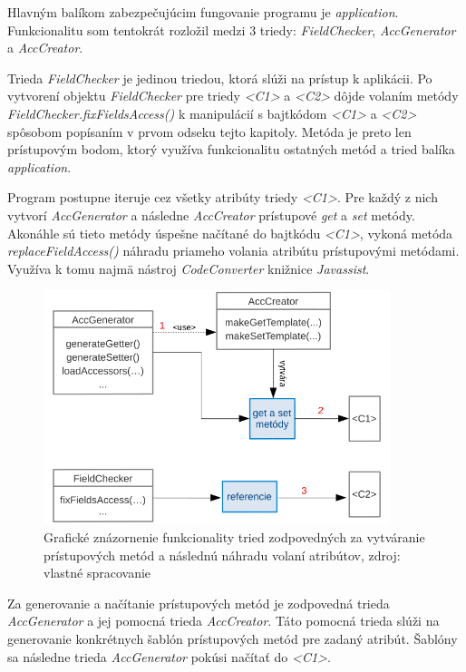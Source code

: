 \documentclass[11pt,final,oneside]{fithesis}
\begin{document}
Hlavným balíkom zabezpečujúcim fungovanie programu je \textit{application}. 
Funkcionalitu som tentokrát rozložil medzi 3 triedy: \textit{FieldChecker}, 
\textit{AccGenerator} a \textit{AccCreator}.

Trieda \textit{FieldChecker} je jedinou triedou, ktorá slúži na prístup k 
aplikácii. Po vytvorení objektu \textit{FieldChecker} pre triedy \textit{<C1>} 
a \textit{<C2>} dôjde volaním metódy \textit{FieldChecker.fixFieldsAccess()} k 
manipulácií s bajtkódom \textit{<C1>} a \textit{<C2>} spôsobom popísaním v 
prvom odseku tejto kapitoly. Metóda je preto len prístupovým bodom, ktorý 
využíva funkcionalitu ostatných metód a tried balíka \textit{application}.

Program postupne iteruje cez všetky atribúty triedy \textit{<C1>}. Pre každý 
z nich vytvorí \textit{AccGenerator} a následne \textit{AccCreator} prístupové
\textit{get} a \textit{set} metódy. Akonáhle sú tieto metódy úspešne načítané 
do bajtkódu \textit{<C1>}, vykoná metóda \textit{replaceFieldAccess()} náhradu 
priameho volania atribútu prístupovými metódami. Využíva k tomu najmä nástroj 
\textit{CodeConverter} knižnice \textit{Javassist}.

\begin{figure}[h]
  \centering
   \includegraphics[width=0.9\textwidth]{improvement.png}
  \caption{Grafické znázornenie funkcionality tried zodpovedných za vytváranie
  prístupových metód a následnú náhradu volaní atribútov, zdroj: vlastné 
  spracovanie}
  \label{fig:improvement}
\end{figure}

Za generovanie a načítanie prístupových metód je zodpovedná trieda 
\textit{AccGenerator} a jej pomocná trieda \textit{AccCreator}. Táto pomocná 
trieda slúži na generovanie konkrétnych šablón prístupových metód pre zadaný 
atribút. Šablóny sa následne trieda \textit{AccGenerator} pokúsi načítať do
\textit{<C1>}.
\end{document}
